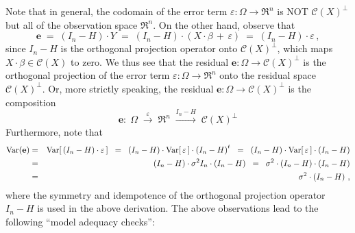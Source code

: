 \documentclass{article}
\begin{document}
Note that in general, the codomain of the error term $\varepsilon : \Omega \longrightarrow \Re^{n}$
is NOT $\mathcal{C}(X)^{\perp}$ but all of the observation space $\Re^{n}$.
On the other hand, observe that
\begin{equation*}
\mathbf{e}
\; = \; \left(I_{n} - H\right)\cdot Y 
\; = \; \left(I_{n} - H\right)\cdot \left(X\cdot\beta \, + \, \varepsilon\right)
\; = \; \left(I_{n} - H\right)\cdot \varepsilon\,,
\end{equation*}
since $I_{n} - H$ is the orthogonal projection operator onto $\mathcal{C}(X)^{\perp}$, which maps
$X\cdot\beta \in \mathcal{C}(X)$ to zero.
We thus see that the residual $\mathbf{e} : \Omega \longrightarrow \mathcal{C}(X)^{\perp}$ is the
orthogonal projection of the error term $\varepsilon : \Omega \longrightarrow \Re^{n}$ onto the
residual space $\mathcal{C}(X)^{\perp}$.
Or, more strictly speaking, the residual $\mathbf{e} : \Omega \longrightarrow \mathcal{C}(X)^{\perp}$
is the composition
\begin{equation*}
\mathbf{e} :
\;\Omega
\;\overset{\varepsilon}{\longrightarrow} \; \Re^{n}
\;\overset{I_{n}-H}{\longrightarrow} \; \mathcal{C}(X)^{\perp}
\end{equation*}
Furthermore, note that
\begin{eqnarray*}
\textnormal{Var}\!\left(\mathbf{e}\right)
&=&\textnormal{Var}\!\left[\,\left(I_{n} - H\right)\cdot \varepsilon\,\right]
\;\;=\;\;\left(I_{n}-H\right)\cdot\textnormal{Var}\!\left[\,\varepsilon\,\right]\cdot \left(I_{n} - H\right)^{t}
\;\;=\;\;\left(I_{n}-H\right)\cdot\textnormal{Var}\!\left[\,\varepsilon\,\right]\cdot \left(I_{n} - H\right)\\
&=&\left(I_{n}-H\right)\cdot \sigma^{2}I_{n} \cdot \left(I_{n} - H\right)
\;\;=\;\;\sigma^{2}\cdot\left(I_{n}-H\right) \cdot \left(I_{n} - H\right) \\
&=&\sigma^{2}\cdot\left(I_{n}-H\right)\,,
\end{eqnarray*}
where the symmetry and idempotence of the orthogonal projection operator $I_{n} - H$ is used in the above
derivation.
The above observations lead to the following ``model adequacy checks'':
\end{document}
